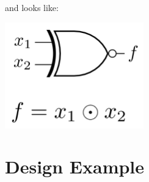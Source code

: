 \documentclass[12pt,openany, tikz,border=10pt]{book}
\begin{document}
			      	and looks like:
			      	\begin{center}
			      		\begin{minipage}[c]{0.45\textwidth} %
			      			\centering
			      			\includegraphics[width=0.45\textwidth]{circuits/6.11.2.png} %
			      		\end{minipage}
			      	\end{center}
			      	
			      	\section{Design Example}
\end{document}
